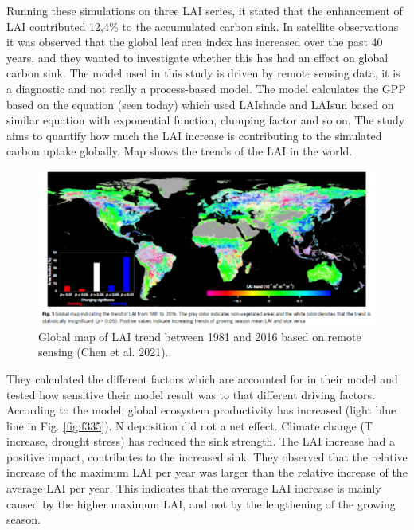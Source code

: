 \documentclass[
  12pt,
  oneside]{book}
\begin{document}
Running these simulations on three LAI series, it stated that the enhancement of LAI contributed 12,4\% to the accumulated carbon sink.
In satellite observations it was observed that the global leaf area index has increased over the past 40 years, and they wanted to investigate whether this has had an effect on global carbon sink. The model used in this study is driven by remote sensing data, it is a diagnostic and not really a process-based model. The model calculates the GPP based on the equation (seen today) which used LAIshade and LAIsun based on similar equation with exponential function, clumping factor and so on. The study aims to quantify how much the LAI increase is contributing to the simulated carbon uptake globally.
Map shows the trends of the LAI in the world.

\begin{figure}

{\centering \includegraphics[width=0.8\linewidth]{figures/chap3/f334_chen1} 

}

\caption{Global map of LAI trend between 1981 and 2016 based on remote sensing (Chen et al. 2021).}\label{fig:f334}
\end{figure}

They calculated the different factors which are accounted for in their model and tested how sensitive their model result was to that different driving factors. According to the model, global ecosystem productivity has increased (light blue line in Fig. \ref{fig:f335}). N deposition did not a net effect. Climate change (T increase, drought stress) has reduced the sink strength. The LAI increase had a positive impact, contributes to the increased sink.
They observed that the relative increase of the maximum LAI per year was larger than the relative increase of the average LAI per year. This indicates that the average LAI increase is mainly caused by the higher maximum LAI, and not by the lengthening of the growing season.
\end{document}
